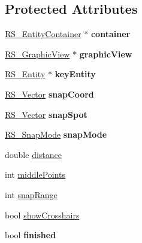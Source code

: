 \subsection*{Protected Attributes}
\begin{DoxyCompactItemize}
\item 
\hypertarget{classRS__Snapper_afe9a1c1536835a7843e442b9310c69b9}{\hyperlink{classRS__EntityContainer}{R\-S\-\_\-\-Entity\-Container} $\ast$ {\bfseries container}}\label{classRS__Snapper_afe9a1c1536835a7843e442b9310c69b9}

\item 
\hypertarget{classRS__Snapper_a44e18ea0dc16f32b6155dc9635d1cfb1}{\hyperlink{classRS__GraphicView}{R\-S\-\_\-\-Graphic\-View} $\ast$ {\bfseries graphic\-View}}\label{classRS__Snapper_a44e18ea0dc16f32b6155dc9635d1cfb1}

\item 
\hypertarget{classRS__Snapper_a641651ad5f1cb0060985c377273b3341}{\hyperlink{classRS__Entity}{R\-S\-\_\-\-Entity} $\ast$ {\bfseries key\-Entity}}\label{classRS__Snapper_a641651ad5f1cb0060985c377273b3341}

\item 
\hypertarget{classRS__Snapper_abf3b197c953b0bb1ec93bd0131301480}{\hyperlink{classRS__Vector}{R\-S\-\_\-\-Vector} {\bfseries snap\-Coord}}\label{classRS__Snapper_abf3b197c953b0bb1ec93bd0131301480}

\item 
\hypertarget{classRS__Snapper_a442a6a7a2d79f790a3c07a394565d95b}{\hyperlink{classRS__Vector}{R\-S\-\_\-\-Vector} {\bfseries snap\-Spot}}\label{classRS__Snapper_a442a6a7a2d79f790a3c07a394565d95b}

\item 
\hypertarget{classRS__Snapper_a8b3d2c4dc37f244e0185f48ed2d5d71c}{\hyperlink{structRS__SnapMode}{R\-S\-\_\-\-Snap\-Mode} {\bfseries snap\-Mode}}\label{classRS__Snapper_a8b3d2c4dc37f244e0185f48ed2d5d71c}

\item 
double \hyperlink{classRS__Snapper_a4eb01ef2a485e653319522fb96185147}{distance}
\item 
int \hyperlink{classRS__Snapper_aebc3dc03d9e59ae8a04eeee9c2709827}{middle\-Points}
\item 
int \hyperlink{classRS__Snapper_a5ed0cc04b5bb18a06bdbbd5900f22cce}{snap\-Range}
\item 
bool \hyperlink{classRS__Snapper_ac0ecee6e6a8357e359c2db6b41227bc9}{show\-Crosshairs}
\item 
\hypertarget{classRS__Snapper_a7b36757e36408bc7d46b1f46a70a32f6}{bool {\bfseries finished}}\label{classRS__Snapper_a7b36757e36408bc7d46b1f46a70a32f6}

\end{DoxyCompactItemize}



